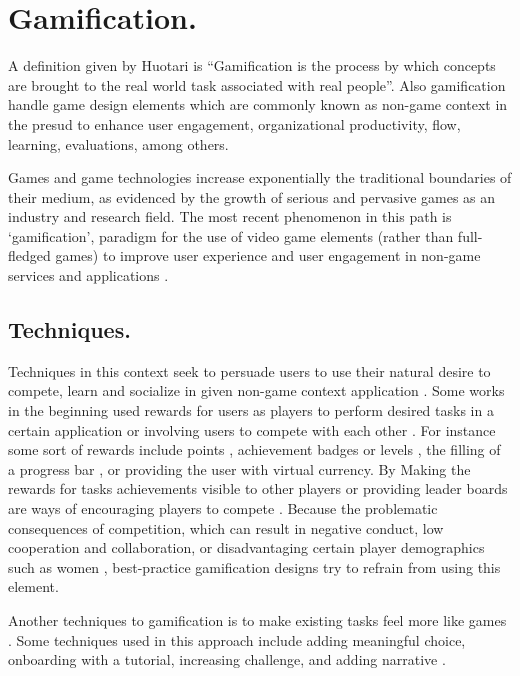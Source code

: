 \section{Gamification.}

A definition given by Huotari  \cite{huotari2012defining} is  “Gamification is
the process by which concepts are brought to the real world task associated with
real people”. Also gamification handle game design elements which are commonly
known as non-game context in the presud to  enhance user engagement,
organizational productivity, flow, learning, evaluations, among others.

Games and game technologies increase exponentially the traditional boundaries of
their medium, as evidenced by the growth of serious and pervasive games as an
industry and research field. The most recent phenomenon in this path is
‘gamification’, paradigm for the use of video game elements (rather than full-
fledged games) to improve user experience and user engagement in non-game
services and applications \cite{deterding2011gamification}.

\subsection{Techniques.}


Techniques in this context seek to persuade users to use their natural desire to compete, learn and socialize in
given non-game context application \cite{deterding2011game}\cite{hamari2014does}. Some works in the beginning used rewards for users as players to perform desired tasks in a certain application or involving users to compete with each other . For instance
some sort of rewards include points \cite{sutter2010browse}, achievement badges or levels \cite{hamari2011framework}, the
filling of a progress bar \cite{o2010get}, or providing the user with virtual currency.
By Making the rewards for  tasks achievements visible to other players or
providing leader boards are ways of encouraging players to compete \cite{hickman2010total}. Because
the  problematic consequences of competition, which can result in negative
conduct, low cooperation and collaboration, or disadvantaging certain player
demographics such as women \cite{kumar2013gamification}, best-practice gamification designs try to
refrain from using this element.

Another techniques to gamification is to make existing tasks feel more like
games \cite{deterding2010just}. Some techniques used in this approach include adding meaningful
choice, onboarding with a tutorial, increasing challenge, and adding
narrative \cite{mcgonigal2011reality}.



